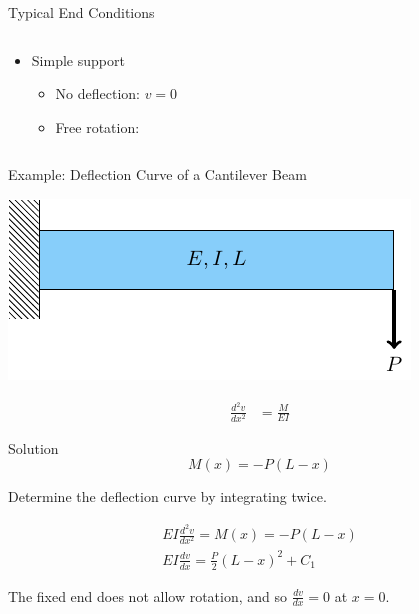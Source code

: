 \documentclass[10pt, svgnames]{beamer}
\begin{document}
\begin{frame}[label={sec:org110effd}]{Typical End Conditions}
\begin{columns}
\begin{column}{0.5\columnwidth}
\begin{itemize}
\begin{itemize}
\item No deflection: \(v = 0\)

\item No rotation: \(\dfrac{dv}{dx} = 0\)
\end{itemize}

\item Simple support

\begin{itemize}
\item No deflection: \(v = 0\)

\item Free rotation:
\end{itemize}
\end{itemize}
\end{column}
\end{columns}
\end{frame}

\begin{frame}[label={sec:org03921f5}]{Example: Deflection Curve of a Cantilever Beam}
\begin{center}
\includegraphics[width=.9\linewidth]{pictures/deflection-curve-example.pdf}
\end{center}

\begin{align*}
    \frac{d^{2}v}{dx^{2}} &= \frac{M}{EI}
\end{align*}
\end{frame}

\begin{frame}[label={sec:org0e2d6de}]{Solution}
\[M(x) =  - P(L - x)\]

Determine the deflection curve by integrating twice.

\begin{gather*}
  EI\frac{d^2v}{dx^2} = M(x) =  - P(L - x) \\
  EI\frac{dv}{dx} = \frac{P}{2}(L - x)^2 + C_1
\end{gather*}

The fixed end does not allow rotation, and so \(\frac{dv}{dx} = 0\) at
\(x = 0\).
\end{frame}
\end{document}
